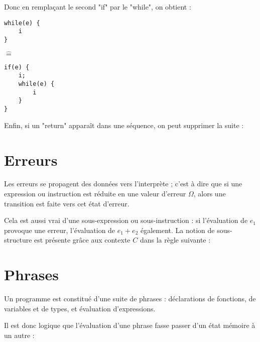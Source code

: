 Donc en remplaçant le second "if" par le "while", on obtient :

\begin{minipage}{0.3\textwidth}
\begin{Verbatim}
while(e) {
    i
}
\end{Verbatim}
\end{minipage}
$\widehat{=}$\hspace{1cm}
\begin{minipage}{0.3\textwidth}
\begin{Verbatim}
if(e) {
    i;
    while(e) {
        i
    }
}
\end{Verbatim}
\end{minipage}

Enfin, si un "return" apparaît dans une séquence, on peut supprimer la suite :

\begin{mathpar}
\end{mathpar}

\section{Erreurs}
\label{sec:eval-errors}


Les erreurs se propagent des données vers l'interprète ; c'est à dire que si
une expression ou instruction est réduite en une valeur d'erreur $Ω$, alors une
transition est faite vers cet état d'erreur.

Cela est aussi vrai d'une sous-expression ou sous-instruction : si l'évaluation
de $e_1$ provoque une erreur, l'évaluation de $e_1 + e_2$ également. La notion
de sous-structure est présente grâce aux contexte $C$ dans la règle suivante :

\begin{mathpar}

\end{mathpar}


\section{Phrases}

Un programme est constitué d'une suite de phrases : déclarations de fonctions,
de variables et de types, et évaluation d'expressions.

Il est donc logique que l'évaluation d'une phrase fasse passer d'un état mémoire
à un autre :

